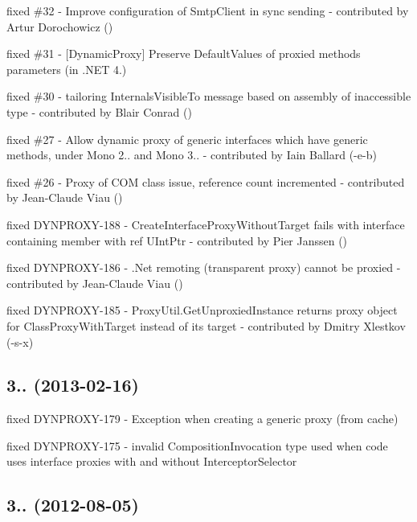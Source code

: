 \begin{DoxyItemize}
\item fixed \#32 -\/ Improve configuration of Smtp\+Client in sync sending -\/ contributed by Artur Dorochowicz ()
\item fixed \#31 -\/ \mbox{[}Dynamic\+Proxy\mbox{]} Preserve Default\+Values of proxied method\textquotesingle{}s parameters (in .N\+ET 4.)
\item fixed \#30 -\/ tailoring Internals\+Visible\+To message based on assembly of inaccessible type -\/ contributed by Blair Conrad ()
\item fixed \#27 -\/ Allow dynamic proxy of generic interfaces which have generic methods, under Mono 2.. and Mono 3.. -\/ contributed by Iain Ballard (-\/e-\/b)
\item fixed \#26 -\/ Proxy of C\+OM class issue, reference count incremented -\/ contributed by Jean-\/\+Claude Viau ()
\item fixed D\+Y\+N\+P\+R\+O\+X\+Y-\/188 -\/ Create\+Interface\+Proxy\+Without\+Target fails with interface containing member with \textquotesingle{}ref U\+Int\+Ptr\textquotesingle{} -\/ contributed by Pier Janssen ()
\item fixed D\+Y\+N\+P\+R\+O\+X\+Y-\/186 -\/ .Net remoting (transparent proxy) cannot be proxied -\/ contributed by Jean-\/\+Claude Viau ()
\item fixed D\+Y\+N\+P\+R\+O\+X\+Y-\/185 -\/ Proxy\+Util.\+Get\+Unproxied\+Instance returns proxy object for Class\+Proxy\+With\+Target instead of its target -\/ contributed by Dmitry Xlestkov (-\/s-\/x)
\end{DoxyItemize}

\subsection*{3.. (2013-\/02-\/16)}


\begin{DoxyItemize}
\item fixed D\+Y\+N\+P\+R\+O\+X\+Y-\/179 -\/ Exception when creating a generic proxy (from cache)
\item fixed D\+Y\+N\+P\+R\+O\+X\+Y-\/175 -\/ invalid Composition\+Invocation type used when code uses interface proxies with and without Interceptor\+Selector
\end{DoxyItemize}

\subsection*{3.. (2012-\/08-\/05)}


